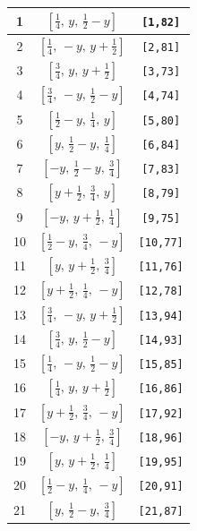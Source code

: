 \documentclass[fleqn,8pt]{jsarticle}
\begin{document}
\begin{longtable}{ccc}
1 & $\left[ \frac{1}{4},\, y,\, \frac{1}{2} - y \right]$ & {\tt [1,82]} \\ \hline
2 & $\left[ \frac{1}{4},\, - y,\, y + \frac{1}{2} \right]$ & {\tt [2,81]} \\ \hline
3 & $\left[ \frac{3}{4},\, y,\, y + \frac{1}{2} \right]$ & {\tt [3,73]} \\ \hline
4 & $\left[ \frac{3}{4},\, - y,\, \frac{1}{2} - y \right]$ & {\tt [4,74]} \\ \hline
5 & $\left[ \frac{1}{2} - y,\, \frac{1}{4},\, y \right]$ & {\tt [5,80]} \\ \hline
6 & $\left[ y,\, \frac{1}{2} - y,\, \frac{1}{4} \right]$ & {\tt [6,84]} \\ \hline
7 & $\left[ - y,\, \frac{1}{2} - y,\, \frac{3}{4} \right]$ & {\tt [7,83]} \\ \hline
8 & $\left[ y + \frac{1}{2},\, \frac{3}{4},\, y \right]$ & {\tt [8,79]} \\ \hline
9 & $\left[ - y,\, y + \frac{1}{2},\, \frac{1}{4} \right]$ & {\tt [9,75]} \\ \hline
10 & $\left[ \frac{1}{2} - y,\, \frac{3}{4},\, - y \right]$ & {\tt [10,77]} \\ \hline
11 & $\left[ y,\, y + \frac{1}{2},\, \frac{3}{4} \right]$ & {\tt [11,76]} \\ \hline
12 & $\left[ y + \frac{1}{2},\, \frac{1}{4},\, - y \right]$ & {\tt [12,78]} \\ \hline
13 & $\left[ \frac{3}{4},\, - y,\, y + \frac{1}{2} \right]$ & {\tt [13,94]} \\ \hline
14 & $\left[ \frac{3}{4},\, y,\, \frac{1}{2} - y \right]$ & {\tt [14,93]} \\ \hline
15 & $\left[ \frac{1}{4},\, - y,\, \frac{1}{2} - y \right]$ & {\tt [15,85]} \\ \hline
16 & $\left[ \frac{1}{4},\, y,\, y + \frac{1}{2} \right]$ & {\tt [16,86]} \\ \hline
17 & $\left[ y + \frac{1}{2},\, \frac{3}{4},\, - y \right]$ & {\tt [17,92]} \\ \hline
18 & $\left[ - y,\, y + \frac{1}{2},\, \frac{3}{4} \right]$ & {\tt [18,96]} \\ \hline
19 & $\left[ y,\, y + \frac{1}{2},\, \frac{1}{4} \right]$ & {\tt [19,95]} \\ \hline
20 & $\left[ \frac{1}{2} - y,\, \frac{1}{4},\, - y \right]$ & {\tt [20,91]} \\ \hline
21 & $\left[ y,\, \frac{1}{2} - y,\, \frac{3}{4} \right]$ & {\tt [21,87]} \\ \hline

\end{longtable}
\end{document}

